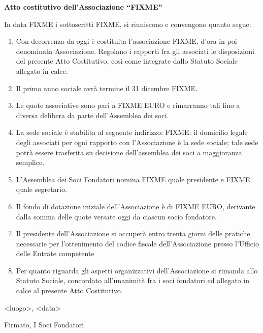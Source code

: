 \documentclass[a4paper,11pt,oneside]{article}
\begin{document}
\pagestyle{empty}
\linenumbers
\noindent\textbf{Atto costitutivo dell'Associazione ``FIXME''}

\vspace{1cm}

In data FIXME i sottoscritti FIXME, si riuniscono e convengono quanto segue:

\begin{enumerate}

 \item Con decorrenza da oggi è costituita l'associazione FIXME, d'ora in poi denominata Associazione. Regolano i rapporti fra gli associati le disposizioni del presente Atto Costitutivo, così come integrate dallo Statuto Sociale allegato in calce.

 \item Il primo anno sociale avrà termine il 31 dicembre FIXME.

 \item Le quote associative sono pari a FIXME EURO e rimarranno tali fino a diversa delibera da parte dell'Assemblea dei soci.

\item La sede sociale è stabilita al seguente indirizzo: FIXME; il domicilio legale degli associati per ogni rapporto con l'Associazione è la sede sociale; tale sede potrà essere trasferita su decisione dell'assemblea dei soci a maggioranza semplice.

\item L'Assemblea dei Soci Fondatori nomina FIXME quale presidente e FIXME quale segretario. 

\item Il fondo di dotazione iniziale dell'Associazione è di FIXME EURO, derivante dalla somma delle quote versate oggi da ciascun socio fondatore.

\item Il presidente dell'Associazione si occuperà entro trenta giorni delle pratiche necessarie per l'ottenimento del codice fiscale dell'Associazione presso l'Ufficio delle Entrate competente

\item Per quanto riguarda gli aspetti organizzativi dell'Associazione si rimanda allo Statuto Sociale, concordato all'unanimità fra i soci fondatori ed allegato in calce al presente Atto Costitutivo.

\end{enumerate}

<luogo>, <data> \par
\vspace{5mm}
Firmato, I Soci Fondatori \par
\end{document}

